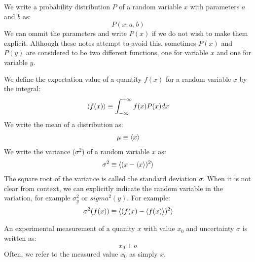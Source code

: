 \documentclass[12pt,oneside]{book}
\begin{document}
We write a probability distribution $P$ of a random variable $x$ with parameters $a$ and $b$ as:
\begin{displaymath}
P(x; a, b)
\end{displaymath}
We can ommit the parameters and write $P(x)$ if we do not wish to make
them explicit.  Although these notes attempt to avoid this, sometimes
$P(x)$ and $P(y)$ are considered to be two different functions, one
for variable $x$ and one for variable $y$.

We define the expectation value of a quantity $f(x)$ for a random
variable $x$ by the integral:
\begin{displaymath}
\braket{f(x)} \equiv \int_{-\infty}^{+\infty} f(x) P(x) dx
\end{displaymath}  
We write the mean of a distribution as:
\begin{displaymath}
\mu \equiv \braket{x}
\end{displaymath}  
We write the variance ($\sigma^2$) of a random variable $x$ as:
\begin{displaymath}
\sigma^2 \equiv \braket{(x - \braket{x})^2}
\end{displaymath}
The square root of the variance is called the standard deviation
$\sigma$.
When it is not clear from context, we can explicitly indicate the random variable in the variation, for example $\sigma^2_y$ or $sigma^2(y)$.  For example:
\begin{displaymath}
\sigma^2(f(x)) \equiv \braket{(f(x) - \braket{f(x)})^2}
\end{displaymath}


An experimental measurement of a quanity $x$ with value $x_0$ and
uncertainty $\sigma$ is written as:
\begin{displaymath}
x_0 \pm \sigma
\end{displaymath}
Often, we refer to the measured value $x_0$ as simply $x$.
\end{document}
